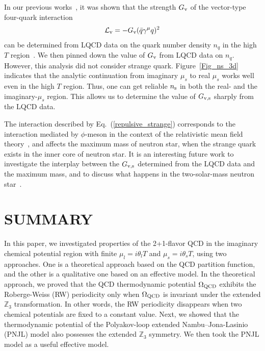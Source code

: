 \documentclass[prd,superscriptaddress,unsortedaddress,
twocolumn,showpacs,preprintnumbers,amsmath,amssymb]{revtex4}
\begin{document}
  In our previous works~\cite{Sugano},
  it was shown that
  the strength $G_{\rm v}$ of the vector-type four-quark interaction
   \begin{eqnarray}
    \mathcal{L}_{\rm v}=-G_{\rm v}(\bar{q}\gamma^{\mu}q)^2
     \label{vector_four}
   \end{eqnarray}
   can be determined from LQCD data on the quark number density $n_{q}$
   in the high $T$ region~\cite{Takahashi2, Ejiri}.
   We then pinned down the value of $G_{\rm v}$ from LQCD data on 
   $n_{q}$. However, this analysis did not consider strange quark. 
   Figure~\ref{Fig_ns_3d} indicates that 
   the analytic continuation from imaginary $\mu_s$ to real $\mu_s$ 
   works well even in the high $T$ region.
Thus, one can get reliable $n_{\rm s}$ in both the 
real- and the imaginary-$\mu_s$ region. This allows us to determine
the value of $G_{\rm v,s}$ sharply from the LQCD data. 

  The interaction described by Eq.~(\ref{repulsive_strange})
  corresponds to the interaction
  mediated by $\phi$-meson in the context of the relativistic mean
  field theory~\cite{RMF_Glendenning, RMF_Schaffner,
  RMF_Ishizuka, RMF_Tsubakihara, RMF_Weissenborn},
  and affects the maximum mass of neutron star, when 
  the strange quark exists in the inner core of neutron star.
  It is an interesting future work to investigate the interplay 
  between the $G_{\rm v,s}$ 
  determined from the LQCD data and the maximum mass, and to discuss 
  what happens in the two-solar-mass neutron star~\cite{Demorest, Antoniadis}.


  \section{SUMMARY}
  \label{Sec_5}
  In this paper, we investigated
  properties of the 2+1-flavor QCD in
  the imaginary chemical potential region with finite 
  $\mu_{l}=i\theta_{l}T$ and $\mu_{s}=i\theta_{s}T$, 
  using two approaches. One is a theoretical approach based 
  on the QCD partition function, 
  and the other is a qualitative one based on an effective model. 
  In the theoretical approach, we proved that the QCD thermodynamic 
potential $\Omega_{\rm QCD}$
  exhibits the Roberge-Weiss (RW) periodicity
  only when $\Omega_{\rm QCD}$ is invariant under the 
  extended $\mathbb{Z}_{3}$ transformation. 
  In other words, the RW periodicity disappears when
 two chemical potentials are fixed to a constant value.
  Next, we showed that the thermodynamic potential 
of the Polyakov-loop extended Nambu--Jona-Lasinio (PNJL) model 
also possesses the extended $\mathbb{Z}_{3}$ symmetry. 
We then took the PNJL model as a useful effective model. 
\end{document}
